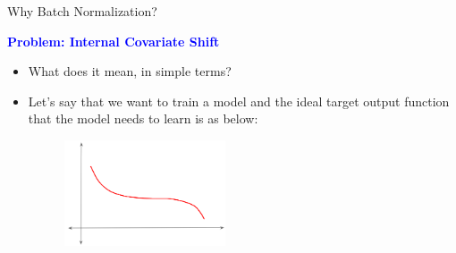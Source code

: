 \documentclass[serif, aspectratio=169]{beamer}
\begin{document}
\begin{frame}{Why Batch Normalization?}

    \textcolor{blue}{\textbf{Problem: Internal Covariate Shift}}

\begin{itemize}

    \item What does it mean, in simple terms?
    \item Let’s say that we want to train a model and the ideal target output function that the model needs to learn is as below:

    \begin{figure}
        \includegraphics[width=0.45\textwidth]{pic/ICS-1.png}
        \label{fig:Target_function}
    \end{figure}

        \vfill

\end{itemize}

\end{frame}
\end{document}
